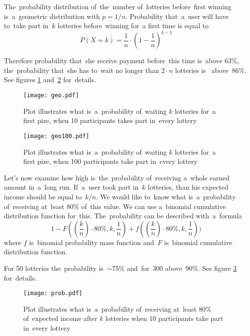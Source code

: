 \documentclass[a4paper]{article}
\begin{document}
    The~probability distribution of~the~number of~lotteries before~first winning is~a~geometric distribution with
    $p = 1/n$. Probability that~a~user will have to~take part in~$k$ lotteries before~winning for~a first time is
    equal to
    \begin{displaymath}
	    P(X = k) = \frac{1}{n} \cdot (1 - \frac{1}{n})^{k-1}
	\end{displaymath}

    Therefore probability that~she receive payment before~this time is~above 63\%, the~probability that~she has to~wait
    no longer than $2 \cdot n$ lotteries  is~ above~$86\%$. See figures \ref{fig:geo} and~\ref{fig:geo100} for~details.

    \begin{figure}
        \centering
        \texttt{[image: geo.pdf]}
        \caption{Plot illustrates what is~a~probability of~waiting $k$ lotteries for~a first pize, when 10 participants
        takes part in~every lottery}
        \label{fig:geo}
    \end{figure}

    \begin{figure}
        \centering
        \texttt{[image: geo100.pdf]}
        \caption{Plot illustrates what is~a~probability of~waiting $k$ lotteries for~a first pize, when
        100 participants take part in~every lottery}
        \label{fig:geo100}
    \end{figure}

    Let's now examine how high is~the~probability of~receiving a~whole earned amount in~a~long run. If~a~user took part
    in~$k$ lotteries, than his expected income should be equal to~$k/n$. We would like to~know what is~a~probability
    of~receiving at~least  80\% of~this value. We can use a~binomial cumulative distribution function for~this.
    The~probability can be described with~a~formula
    \begin{displaymath}
        1 - F((\frac{k}{n})\cdot 80\%, k, \frac{1}{n}) + f((\frac{k}{n})\cdot 80\%, k, \frac{1}{n}))
    \end{displaymath}
    where $f$ is~binomial probability mass function and~$F$ is~binomial cumulative distribution function.

    For 50 lotteries the~probability is~$\sim$75\%  and~for~300 above~$90\%$. See figure \ref{fig:prob} for~details.


    \begin{figure}
        \centering
        \texttt{[image: prob.pdf]}
        \caption{Plot illustrates what is~a~probability of~receiving at~least 80\% of~expected income after $k$
        lotteries when 10 participants take part in~every lottery}
        \label{fig:prob}
    \end{figure}
\end{document}

